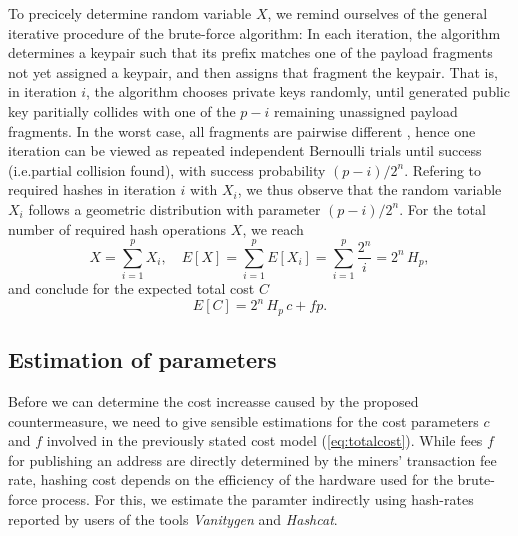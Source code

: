 \documentclass[10pt,a4paper,twocolumn]{article}
\begin{document}
To precicely determine random variable $X$, we remind ourselves of the general iterative procedure of the brute-force algorithm:
In each iteration, the algorithm determines a keypair such that its prefix matches one of the payload fragments not yet assigned a keypair, and then assigns that fragment the keypair.
That is, in iteration $i$, the algorithm chooses private keys randomly, until generated public key paritially collides with one of the $p-i$ remaining unassigned payload fragments.
In the worst case, all fragments are pairwise different%
, hence one iteration can be viewed as repeated independent Bernoulli trials until success (i.e.\@ partial collision found), with success probability $(p-i)/2^n$.  
Refering to required hashes in iteration $i$ with $X_i$, we thus observe that the random variable $X_i$ follows a geometric distribution with parameter $(p-i)/2^n$.
For the total number of required hash operations $X$, we reach
\[ X = \sum_{i=1}^{p} X_i, \quad E[X] = \sum_{i=1}^{p} E[X_i] = \sum_{i=1}^{p}\frac{2^n}{i} = 2^n\, H_p, \]
and conclude for the expected total cost $C$
\begin{equation}
    E[C] = 2^n\, H_p\,c + fp.\label{eq:totalcost}
\end{equation}


\subsection{Estimation of parameters}



Before we can determine the cost increasse caused by the proposed countermeasure, we need to give sensible estimations for the cost parameters $c$ and $f$ involved in the previously stated cost model (\ref{eq:totalcost}).
While fees $f$ for publishing an address are directly determined by the miners' transaction fee rate, hashing cost depends on the efficiency of the hardware used for the brute-force process.
For this, we estimate the paramter indirectly using hash-rates reported by users of the tools \emph{Vanitygen} and \emph{Hashcat}.
\end{document}
